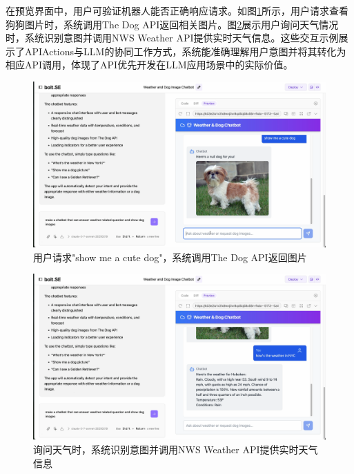 在预览界面中，用户可验证机器人能否正确响应请求。如图\ref{fig:demo_dog}所示，用户请求查看狗狗图片时，系统调用The Dog API返回相关图片。图\ref{fig:demo_weather}展示用户询问天气情况时，系统识别意图并调用NWS Weather API提供实时天气信息。这些交互示例展示了APIActions与LLM的协同工作方式，系统能准确理解用户意图并将其转化为相应API调用，体现了API优先开发在LLM应用场景中的实际价值。

\begin{figure}[H]
  \centering
  \includegraphics[width=\textwidth]{figures/screenshots/api-actions/demo_dog_preview.png}
  \caption{用户请求"show me a cute dog"，系统调用The Dog API返回图片}
  \label{fig:demo_dog}
\end{figure}

\begin{figure}[H]
  \centering
  \includegraphics[width=\textwidth]{figures/screenshots/api-actions/demo_weather_preview.png}
  \caption{询问天气时，系统识别意图并调用NWS Weather API提供实时天气信息}
  \label{fig:demo_weather}
\end{figure}